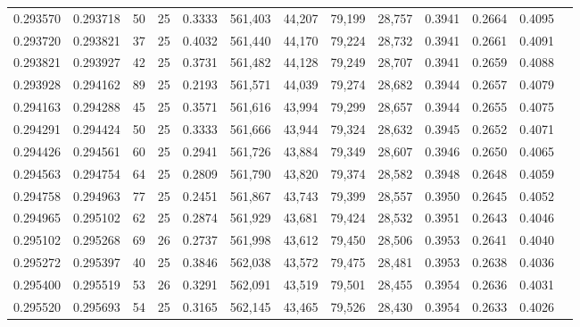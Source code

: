 \begin{tabular}{rrrrrrrrrrrrr}
0.293570 & 0.293718 &    50 &  25 &                                     0.3333 & 561,403 &  44,207 &  79,199 &  28,757 & 0.3941 & 0.2664 & 0.4095 \\
0.293720 & 0.293821 &    37 &  25 &                                     0.4032 & 561,440 &  44,170 &  79,224 &  28,732 & 0.3941 & 0.2661 & 0.4091 \\
0.293821 & 0.293927 &    42 &  25 &                                     0.3731 & 561,482 &  44,128 &  79,249 &  28,707 & 0.3941 & 0.2659 & 0.4088 \\
0.293928 & 0.294162 &    89 &  25 &                                     0.2193 & 561,571 &  44,039 &  79,274 &  28,682 & 0.3944 & 0.2657 & 0.4079 \\
0.294163 & 0.294288 &    45 &  25 &                                     0.3571 & 561,616 &  43,994 &  79,299 &  28,657 & 0.3944 & 0.2655 & 0.4075 \\
0.294291 & 0.294424 &    50 &  25 &                                     0.3333 & 561,666 &  43,944 &  79,324 &  28,632 & 0.3945 & 0.2652 & 0.4071 \\
0.294426 & 0.294561 &    60 &  25 &                                     0.2941 & 561,726 &  43,884 &  79,349 &  28,607 & 0.3946 & 0.2650 & 0.4065 \\
0.294563 & 0.294754 &    64 &  25 &                                     0.2809 & 561,790 &  43,820 &  79,374 &  28,582 & 0.3948 & 0.2648 & 0.4059 \\
0.294758 & 0.294963 &    77 &  25 &                                     0.2451 & 561,867 &  43,743 &  79,399 &  28,557 & 0.3950 & 0.2645 & 0.4052 \\
0.294965 & 0.295102 &    62 &  25 &                                     0.2874 & 561,929 &  43,681 &  79,424 &  28,532 & 0.3951 & 0.2643 & 0.4046 \\
0.295102 & 0.295268 &    69 &  26 &                                     0.2737 & 561,998 &  43,612 &  79,450 &  28,506 & 0.3953 & 0.2641 & 0.4040 \\
0.295272 & 0.295397 &    40 &  25 &                                     0.3846 & 562,038 &  43,572 &  79,475 &  28,481 & 0.3953 & 0.2638 & 0.4036 \\
0.295400 & 0.295519 &    53 &  26 &                                     0.3291 & 562,091 &  43,519 &  79,501 &  28,455 & 0.3954 & 0.2636 & 0.4031 \\
0.295520 & 0.295693 &    54 &  25 &                                     0.3165 & 562,145 &  43,465 &  79,526 &  28,430 & 0.3954 & 0.2633 & 0.4026 \\

\end{tabular}
